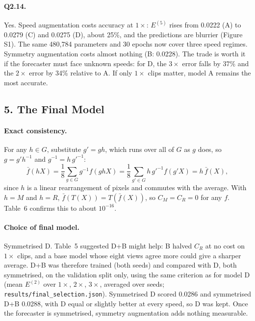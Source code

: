 \paragraph{Q2.14.} Yes. Speed augmentation costs accuracy at $1\times$: $E^{(5)}$ rises from 0.0222 (A) to 0.0279 (C) and 0.0275 (D), about 25\%, and the predictions are blurrier (Figure S1). The same 480,784 parameters and 30 epochs now cover three speed regimes. Symmetry augmentation costs almost nothing (B: 0.0228). The trade is worth it if the forecaster must face unknown speeds: for D, the $3\times$ error falls by 37\% and the $2\times$ error by 34\% relative to A. If only $1\times$ clips matter, model A remains the most accurate.

\subsection*{5. The Final Model}

\paragraph{Exact consistency.} For any $h\in G$, substitute $g'=gh$, which runs over all of $G$ as $g$ does, so $g=g'h^{-1}$ and $g^{-1}=h\,g'^{-1}$:
\[
\bar f(hX)=\frac18\sum_{g\in G} g^{-1}f(ghX)=\frac18\sum_{g'\in G} h\,g'^{-1}f(g'X)=h\,\bar f(X),
\]
since $h$ is a linear rearrangement of pixels and commutes with the average. With $h=M$ and $h=R$, $\bar f(T(X))=T(\bar f(X))$, so $C_M=C_R=0$ for any $f$. Table~6 confirms this to about $10^{-16}$.

\paragraph{Choice of final model.} Symmetrised D. Table~5 suggested D+B might help: B halved $C_R$ at no cost on $1\times$ clips, and a base model whose eight views agree more could give a sharper average. D+B was therefore trained (both seeds) and compared with D, both symmetrised, on the validation split only, using the same criterion as for model D (mean $E^{(2)}$ over $1\times$, $2\times$, $3\times$, averaged over seeds; \texttt{results/final\_selection.json}). Symmetrised D scored 0.0286 and symmetrised D+B 0.0288, with D equal or slightly better at every speed, so D was kept. Once the forecaster is symmetrised, symmetry augmentation adds nothing measurable.

